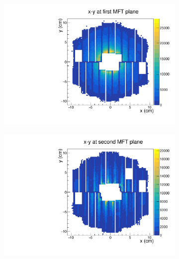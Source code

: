 \begin{figure}[h]%
    \centering
    \begin{subfigure}[t]{.45\linewidth}
        \centering
        \includegraphics[width=\linewidth]{Plots/pass3_MFT/x_y_1_pass3.pdf}
        \caption{}
        \label{}
    \end{subfigure}
    \hfill
    \begin{subfigure}[t]{.45\linewidth}
        \centering
        \includegraphics[width=\linewidth]{Plots/pass3_MFT/x_y_2_pass3.pdf}
        \caption{}
        \label{}
    \end{subfigure}
    \begin{subfigure}[t]{.45\linewidth}
        \centering

\end{subfigure}
\end{figure}
